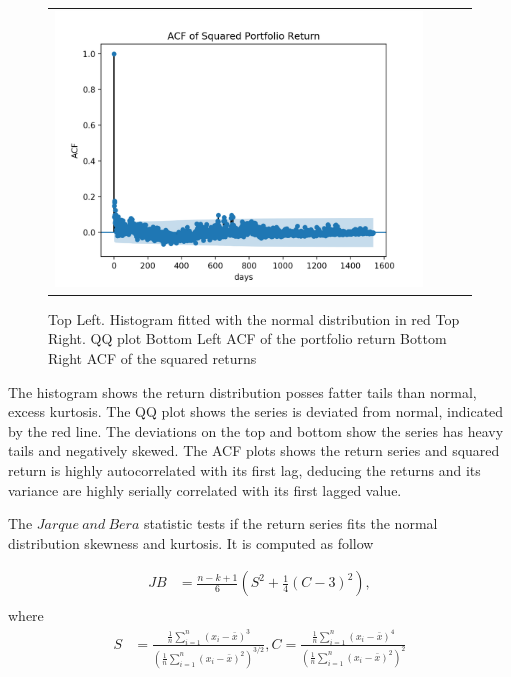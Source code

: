 \documentclass[a4paper,11pt]{article}
\begin{document}
\begin{flushleft}
\begin{itemize}
\begin{figure}[H]
{\begin{tabular}{@{}cccc@{}}
    \includegraphics[scale=0.5]{sq_ret_ACF.png}   \\
  \end{tabular}}
  \caption{Top Left. Histogram fitted with the normal distribution in red Top Right. QQ plot Bottom Left ACF of the portfolio return Bottom Right ACF of the squared returns }
\end{figure}

The histogram shows the return distribution posses fatter tails than normal, excess kurtosis. The QQ plot shows the series is deviated from normal, indicated by the red line. The deviations on the top and bottom show the series has heavy tails and negatively skewed. The ACF plots shows the return series and squared return is highly autocorrelated with its first lag, deducing the returns and its variance are highly serially correlated with its first lagged value. 

The $Jarque \ and \ Bera$ statistic tests if the return series fits the normal distribution skewness and kurtosis. It is computed as follow

\begin{align*}
JB & = \frac{n-k+1}{6}\left(S^2+ \frac{1}{4} \left(C-3\right)^2\right),\\
\end{align*}
where
\begin{align*}
S &= \frac{\frac{1}{n}\sum_{i=1}^n\left(x_i - \bar{x}\right)^3}{\left(\frac{1}{n}\sum_{i=1}^n\left(x_i - \bar{x}\right)^2\right)^{3/2}} ,
C = \frac{\frac{1}{n}\sum_{i=1}^n\left(x_i - \bar{x}\right)^4}{\left(\frac{1}{n}\sum_{i=1}^n\left(x_i - \bar{x}\right)^2\right)^{2}}
\end{align*}


\end{itemize}
\end{flushleft}
\end{document}
